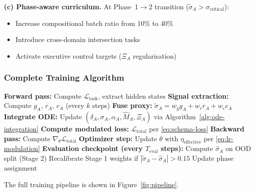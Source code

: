 \documentclass[10pt]{article}
\begin{document}
\textbf{(c) Phase-aware curriculum.} At Phase~1$\to$2 transition
($\tilde{\sigma}_A > \sigma_{\text{critical}}$):
\begin{itemize}[nosep]
\item Increase compositional batch ratio from 10\% to 40\%
\item Introduce cross-domain intersection tasks
\item Activate executive control targets ($\Xi_A$ regularisation)
\end{itemize}

\subsubsection{Complete Training Algorithm}

\begin{algorithm}[H]
\caption{Σ-Model Training Step}\label{alg:training-step}
\begin{algorithmic}
\State \textbf{Forward pass:} Compute $\mathcal{L}_{\text{task}}$, extract hidden states
\State \textbf{Signal extraction:} Compute $g_A$, $r_A$, $c_A$ (every $k$ steps)
\State \textbf{Fuse proxy:} $\tilde{\sigma}_A = w_g g_A + w_r r_A + w_c c_A$
\State \textbf{Integrate ODE:} Update $(\delta_A, \sigma_A, \alpha_A, \hat{M}_A, \Xi_A)$ via Algorithm~\ref{alg:ode-integration}
\State \textbf{Compute modulated loss:} $\mathcal{L}_{\text{total}}$ per \eqref{eq:schema-loss}
\State \textbf{Backward pass:} Compute $\nabla_\theta \mathcal{L}_{\text{total}}$
\State \textbf{Optimizer step:} Update $\theta$ with $\eta_{\text{effective}}$ per \eqref{eq:lr-modulation}
\State \textbf{Evaluation checkpoint (every $T_{\text{eval}}$ steps):}
\State \hspace{\algorithmicindent} Compute $\hat{\sigma}_A$ on OOD split (Stage 2)
\State \hspace{\algorithmicindent} Recalibrate Stage 1 weights if $|\tilde{\sigma}_A - \hat{\sigma}_A| > 0.15$
\State \hspace{\algorithmicindent} Update phase assignment
\end{algorithmic}
\end{algorithm}



The full training pipeline is shown in Figure~\ref{fig:pipeline}.
\end{document}

